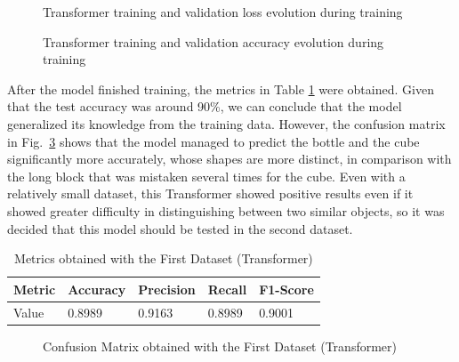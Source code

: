 \begin{figure}[H]
    \centering
    {\fontsize{10}{12}\selectfont}
    \caption[Transformer training and validation loss evolution during training]{Transformer training and validation loss evolution during training}
    \label{fig:transformer_dataset1_loss}
\end{figure}

\begin{figure}[H]
    \centering
    {\fontsize{10}{12}\selectfont}
    \caption[Transformer training and validation accuracy evolution during training]{Transformer training and validation accuracy evolution during training}
    \label{fig:transformer_dataset1_acc}
\end{figure}

After the model finished training, the metrics in Table \ref{table:transformer_dataset1_results} were obtained. Given that the test accuracy was around 90\%, we can conclude that the model generalized its knowledge from the training data. However, the confusion matrix in Fig.~\ref{fig:transformer_dataset1_confusion_matrix} shows that the model managed to predict the bottle and the cube significantly more accurately, whose shapes are more distinct, in comparison with the long block that was mistaken several times for the cube. Even with a relatively small dataset, this Transformer showed positive results even if it showed greater difficulty in distinguishing between two similar objects, so it was decided that this model should be tested in the second dataset.

\begin{table}[H]
    \centering
    \caption{Metrics obtained with the First Dataset (Transformer)}
    \label{table:transformer_dataset1_results}
    \begin{tabular}{|l|l|l|l|l|}
        \hline
        Metric & Accuracy & Precision & Recall & F1-Score \\
        \hline
        Value & 0.8989 & 0.9163 & 0.8989 & 0.9001 \\
        \hline
    \end{tabular}
\end{table}

\begin{figure}[H]
    \centering
    {\fontsize{10}{12}\selectfont}
    \caption[Confusion Matrix obtained with the First Dataset (Transformer)]{Confusion Matrix obtained with the First Dataset (Transformer)}
    \label{fig:transformer_dataset1_confusion_matrix}
\end{figure}


